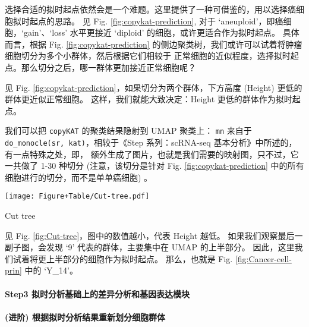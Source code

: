 \documentclass[
]{article}
\newenvironment{Shaded}{\begin{snugshade}}{\end{snugshade}}
\newcommand{\NormalTok}[1]{#1}
\newcommand{\OperatorTok}[1]{\textcolor[rgb]{0.81,0.36,0.00}{\textbf{#1}}}
\begin{document}
选择合适的拟时起点依然会是一个难题。这里提供了一种可借鉴的，用以选择癌细胞拟时起点的思路。
见 Fig. \ref{fig:copykat-prediction}, 对于 `aneuploid'，即癌细胞，`gain'、`loss' 水平更接近
`diploid' 的细胞，或许更适合作为拟时起点。
具体而言，根据 Fig. \ref{fig:copykat-prediction} 的侧边聚类树，我们或许可以试着将肿瘤细胞切分为多个小群体，然后根据它们相较于
正常细胞的近似程度，选择拟时起点。那么切分之后，哪一群体更加接近正常细胞呢？

见 Fig. \ref{fig:copykat-prediction}，如果切分为两个群体，下方高度 (Height) 更低的群体更近似正常细胞。
这样，我们就能大致决定：Height 更低的群体作为拟时起点。

我们可以把 \texttt{copyKAT} 的聚类结果隐射到 UMAP 聚类上：
\texttt{mn} 来自于 \texttt{do\_monocle(sr,\ kat)}，相较于《Step 系列：scRNA-seq 基本分析》中所述的，有一点特殊之处，即，
额外生成了图片，也就是我们需要的映射图，只不过，它一共做了 1-30 种切分
(注意，该切分是针对 Fig. \ref{fig:copykat-prediction} 中的所有细胞进行的切分，而不是单单癌细胞) 。

\begin{Shaded}
\end{Shaded}

\def\@captype{figure}
\begin{center}
\texttt{[image: Figure+Table/Cut-tree.pdf]}
\caption{Cut tree}\label{fig:Cut-tree}
\end{center}

见 Fig. \ref{fig:Cut-tree}，图中的数值越小，代表 Height 越低。
如果我们观察最后一副子图，会发现 `9' 代表的群体，主要集中在 UMAP 的上半部分。
因此，这里我们试着将更上半部分的细胞作为拟时起点。
那么，也就是 Fig. \ref{fig:Cancer-cell-prin} 中的 `Y\_14'。

\hypertarget{step3-ux62dfux65f6ux5206ux6790ux57faux7840ux4e0aux7684ux5deeux5f02ux5206ux6790ux548cux57faux56e0ux8868ux8fbeux6a21ux5757}{%
\paragraph{Step3 拟时分析基础上的差异分析和基因表达模块}\label{step3-ux62dfux65f6ux5206ux6790ux57faux7840ux4e0aux7684ux5deeux5f02ux5206ux6790ux548cux57faux56e0ux8868ux8fbeux6a21ux5757}}

\hypertarget{ux8fdbux9636-ux6839ux636eux62dfux65f6ux5206ux6790ux7ed3ux679cux91cdux65b0ux5212ux5206ux7ec6ux80deux7fa4ux4f53}{%
\paragraph{(进阶) 根据拟时分析结果重新划分细胞群体}\label{ux8fdbux9636-ux6839ux636eux62dfux65f6ux5206ux6790ux7ed3ux679cux91cdux65b0ux5212ux5206ux7ec6ux80deux7fa4ux4f53}}
\end{document}
